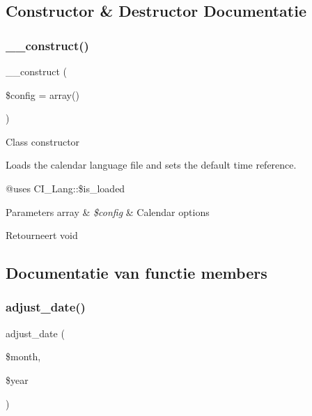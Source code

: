 \subsection{Constructor \& Destructor Documentatie}
\mbox{\label{class_c_i___calendar_af7f9493844d2d66e924e3c1df51ce616}} 
\subsubsection{\texorpdfstring{\_\_construct()}{\_\_construct()}}
{\footnotesize\ttfamily \+\_\+\+\_\+construct (\begin{DoxyParamCaption}\item[{}]{\$config = {\ttfamily array()} }\end{DoxyParamCaption})}

Class constructor

Loads the calendar language file and sets the default time reference.

@uses C\+I\+\_\+\+Lang\+::\$is\+\_\+loaded


\begin{DoxyParams}[1]{Parameters}
array & {\em \$config} & Calendar options \\
\hline
\end{DoxyParams}
\begin{DoxyReturn}{Retourneert}
void 
\end{DoxyReturn}


\subsection{Documentatie van functie members}
\mbox{\label{class_c_i___calendar_ac216356ab0ff31e8538fd9208a26577a}} 
\subsubsection{\texorpdfstring{adjust\_date()}{adjust\_date()}}
{\footnotesize\ttfamily adjust\+\_\+date (\begin{DoxyParamCaption}\item[{}]{\$month,  }\item[{}]{\$year }\end{DoxyParamCaption})}

